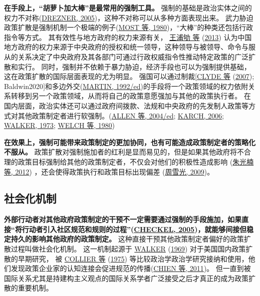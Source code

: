 \documentclass[
  12pt,
]{ctexart}
\begin{document}
\textbf{在手段上，``胡萝卜加大棒''是最常用的强制工具。}
强制的基础是政治实体之间的权力不对称(\protect\hyperlink{ref-Drezner2005}{DREZNER, 2005})，这种不对称可以从多种方面表现出来。
武力胁迫政策扩散是强制机制一个极端的例子(\protect\hyperlink{ref-MostStarr1980a}{MOST 等, 1980})，``大棒''的种类还包括行政指令等方式。
其有效性与地方政府的权力来源有关， \protect\hyperlink{ref-WangPuQuLaiXianJin2013}{王浦劬 等} (\protect\hyperlink{ref-WangPuQuLaiXianJin2013}{2013}) 认为中国地方政府的权力来源于中央政府的授权和统一领导，这种领导与被领导、命令与服从的关系决定了中央政府及其各部门可通过行政权威指令性推动特定政策的广泛扩散和实行。
同时，强制并不依赖于暴力胁迫，经济手段也可以为强制提供基础，这在政策扩散的国际层面表现的尤为明显。
强国可以通过制裁{[}\protect\hyperlink{ref-ClydeEtAl2007}{CLYDE 等} (\protect\hyperlink{ref-ClydeEtAl2007}{2007}); Baldwin2020{]}和多边外交(\protect\hyperlink{ref-Martin1992}{MARTIN, 1992/ed})的手段将一个政策领域的权力依附关系转移到另一个政策领域，从而将自己的政策意愿强加与其他的政策执行者。
在国内层面，政治实体还可以通过政府间拨款、法规和中央政府的先发制人政策等方式对其他政策制定者进行软强制。(\protect\hyperlink{ref-AllenEtAl2004}{ALLEN 等, 2004/ed}; \protect\hyperlink{ref-Karch2006}{KARCH, 2006}; \protect\hyperlink{ref-Walker1973}{WALKER, 1973}; \protect\hyperlink{ref-WelchThompson1980}{WELCH 等, 1980})

\textbf{在效果上，强制可能带来政策制定的更加协同，也有可能造成政策制定者的策略化不服从。}
政策扩散对强制施加者的红利是显而易见的，但是如果其他政府将不合理的政策目标强制给其他的政策制定者，不仅会对他们的积极性造成影响 (\protect\hyperlink{ref-ZhuGuangNanEtAl2012a}{朱光楠 等, 2012}) ，还会使得政策执行和政策目标出现偏差 (\protect\hyperlink{ref-ZhouXueGuang2009a}{周雪光, 2009})。

\hypertarget{ux793eux4f1aux5316ux673aux5236}{%
\subsection{社会化机制}\label{ux793eux4f1aux5316ux673aux5236}}

\textbf{外部行动者对其他政府政策制定的干预不一定需要通过强制的手段施加，如果直接``将行动者引入社区规范和规则的过程''(\protect\hyperlink{ref-Checkel2005}{CHECKEL, 2005})，就能够间接但稳定持久的影响其他政府的政策制定。}
这种直接干预其他政策制定者偏好的政策扩散过程叫做社会化机制。
这一机制起源于 \protect\hyperlink{ref-Walker1969}{WALKER} (\protect\hyperlink{ref-Walker1969}{1969}) 对于美国国内政策扩散的早期研究，
被 \protect\hyperlink{ref-CollierMessick1975}{COLLIER 等} (\protect\hyperlink{ref-CollierMessick1975}{1975}) 等比较政治学政治学研究接纳和使用，他们发现政策企业家的认知连接会促进规范的传播(\protect\hyperlink{ref-CHIENHo2011}{CHIEN 等, 2011})。
但一直到被国际关系尤其是持建构主义观点的国际关系学者广泛接受之后才真正的成为政策扩散的重要机制。
\end{document}
